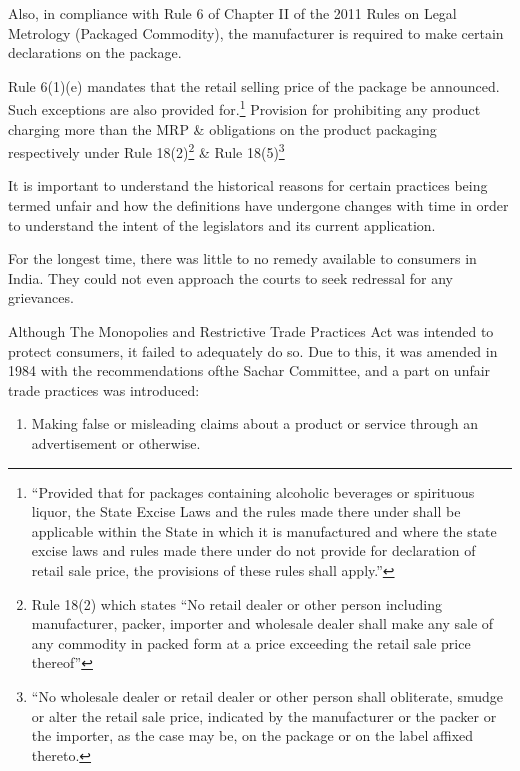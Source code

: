 \begin{multicols}{2}
\noi
Also, in compliance with Rule 6 of Chapter II of the 2011 Rules on Legal Metrology (Packaged
Commodity), the manufacturer is required to make certain declarations on the package.

\noi
Rule 6(1)(e) mandates that the retail selling price of the package be announced. Such
exceptions are also provided for.\footnote{“Provided that for packages containing alcoholic beverages or spirituous liquor, the State Excise Laws and the rules made there under shall be applicable within the State in which it is manufactured and where the state excise laws and rules made there under do not provide for declaration of retail sale price, the provisions of these rules shall apply.”} Provision for prohibiting any product charging more than the MRP \& obligations on the product packaging respectively under Rule 18(2)\footnote{Rule 18(2) which states “No retail dealer or other person including manufacturer, packer, importer and wholesale dealer shall make any sale of any commodity in packed form at a price exceeding the retail sale price thereof”} \& Rule 18(5)\footnote{“No wholesale dealer or retail dealer or other person shall obliterate, smudge or alter the retail sale price, indicated by the manufacturer or the packer or the importer, as the case may be, on the package or on the label affixed thereto.}


\noi
It is important to understand the historical reasons for certain practices being termed unfair and
how the definitions have undergone changes with time in order to understand the intent of the
legislators and its current application.

\noi
For the longest time, there was little to no remedy available to consumers in India. They could
not even approach the courts to seek redressal for any grievances.

\noi
Although The Monopolies and Restrictive Trade Practices Act was intended to protect
consumers, it failed to adequately do so. Due to this, it was amended in 1984 with the
recommendations ofthe Sachar Committee, and a part on unfair trade practices was introduced:

\vspace{-.2cm}

\begin{enumerate}
\itemsep=0pt

\item[1)] Making false or misleading claims about a product or service through an advertisement or otherwise.


\end{enumerate}
\end{multicols}
